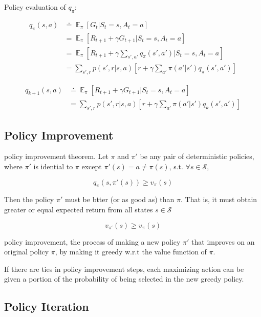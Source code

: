 \documentclass[lang=en,mode=geye,device=normal,color=blue,14pt]{elegantnote}
\DeclareMathOperator*{\E}{\mathbb{E}}
\DeclareMathOperator*{\1}{\mathbbm{1}}
\begin{document}
Policy evaluation of $q_\pi$:

\begin{align*}
q_\pi(s,a) & \doteq \E_\pi [G_t | S_t = s, A_t = a] \\
& = \E_\pi [R_{t+1} + \gamma G_{t+1} | S_t = s, A_t = a] \\
& = \E_\pi [R_{t+1} + \gamma \sum_{s',a'} q_\pi (s',a') | S_t = s, A_t = a] \\
& = \sum_{s',r} p(s',r|s,a) [ r+ \gamma \sum_{a'} \pi(a'|s')q_\pi(s',a')]
\end{align*}

\begin{align*}
q_{k+1}(s,a) & \doteq \E_\pi [R_{t+1} + \gamma G_{t+1} | S_t = s, A_t = a] \\
& = \sum_{s',r} p(s',r|s,a)[r+\gamma \sum_{a'} \pi (a'|s')q_k(s',a')]
\end{align*}

\subsection{Policy Improvement}

\begin{definition}
policy improvement theorem. Let $\pi$ and $\pi'$ be any pair of deterministic policies, where $\pi'$ is idential to $\pi$ except $\pi'(s) = a \neq \pi(s)$, s.t. $\forall s \in \mathcal{S}$,

$$ q_\pi (s,\pi'(s)) \geq v_\pi(s) $$

Then the policy $\pi'$ must be btter (or as good as) than $\pi$. That is, it must obtain greater or equal expected return from all states $s \in \mathcal{S}$

$$ v_{\pi'}(s) \geq v_\pi (s) $$
\end{definition}

\begin{definition}
policy improvement, the process of making a new policy $\pi'$ that improves on an original policy $\pi$, by making it greedy w.r.t the value function of $\pi$.
\end{definition}
 
If there are ties in policy improvement steps, each maximizing action can be given a portion of the probability of being selected in the new greedy policy.

\subsection{Policy Iteration}
\end{document}
